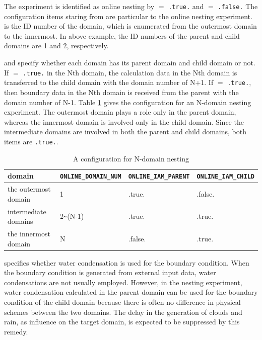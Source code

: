 The experiment is identified as online nesting by  $=$ \verb|.true.| and  $=$ \verb|.false.| The configuration items staring from   are particular to the online nesting experiment.  is the ID number of the domain, which is enumerated from the outermost domain to the innermost.
In above example, the ID numbers of the parent and child domains are 1 and 2, respectively.

 and  specify whether each domain has its parent domain and child domain or not.
If  $=$ \verb|.true.| in the Nth domain, the calculation data in the Nth domain is transferred to the child domain with the domain number of N+1. If  $=$ \verb|.true.|, then boundary data in the Nth domain is received from the parent with the domain number of N-1. Table \ref{tab:triple_nested} gives the configuration for an N-domain nesting experiment.
The outermost domain plays a role only in the parent domain, whereas the innermost domain is involved only in the child domain. Since the intermediate domains are involved in both the parent and child domains, both items are \verb|.true.|.

\begin{table}[htb]
\begin{center}
\caption{A configuration for N-domain nesting}
\begin{tabularx}{150mm}{|l|l|l|X|} \hline
 \rowcolor[gray]{0.9} domain & \verb|ONLINE_DOMAIN_NUM| & \verb|ONLINE_IAM_PARENT| & \verb|ONLINE_IAM_CHILD|\\ \hline
 the outermost domain & 1               & .true.  & .false. \\ \hline
 intermediate domains & 2\verb|~|(N-1) & .true.  & .true. \\ \hline
 the innermost domain & N               & .false. & .true. \\ \hline
\end{tabularx}
\label{tab:triple_nested}
\end{center}
\end{table}


 specifies whether water condensation is used for the boundary condition. When the boundary condition is generated from external input data, water condensations are not usually employed. However, in the nesting experiment, water condensation calculated in the parent domain can be used for the boundary condition of the child domain because there is often no difference in physical schemes between the two domains.
The delay in the generation of clouds and rain, as influence on the target domain, is expected to be suppressed by this remedy.

